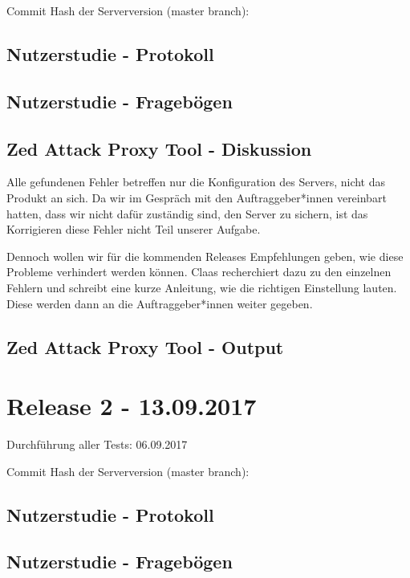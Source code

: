 \documentclass[accentcolor=tud0b,12pt,paper=a4]{tudreport}
\begin{document}
Commit Hash der Serverversion (master branch): 

\subsection*{Nutzerstudie - Protokoll}


\subsection*{Nutzerstudie - Fragebögen}


\subsection*{Zed Attack Proxy Tool - Diskussion}
Alle gefundenen Fehler betreffen nur die Konfiguration des Servers, nicht das Produkt an sich. Da wir im Gespräch mit den Auftraggeber*innen vereinbart hatten, dass wir nicht dafür zuständig sind, den Server zu sichern, ist das Korrigieren diese Fehler nicht Teil unserer Aufgabe.

Dennoch wollen wir für die kommenden Releases Empfehlungen geben, wie diese Probleme verhindert werden können. Claas recherchiert dazu zu den einzelnen Fehlern und schreibt eine kurze Anleitung, wie die richtigen Einstellung lauten. Diese werden dann an die Auftraggeber*innen weiter gegeben.

\subsection*{Zed Attack Proxy Tool - Output}



\section*{Release 2 - 13.09.2017}
Durchführung aller Tests: 06.09.2017

Commit Hash der Serverversion (master branch): 

\subsection*{Nutzerstudie - Protokoll}


\subsection*{Nutzerstudie - Fragebögen}
\end{document}
